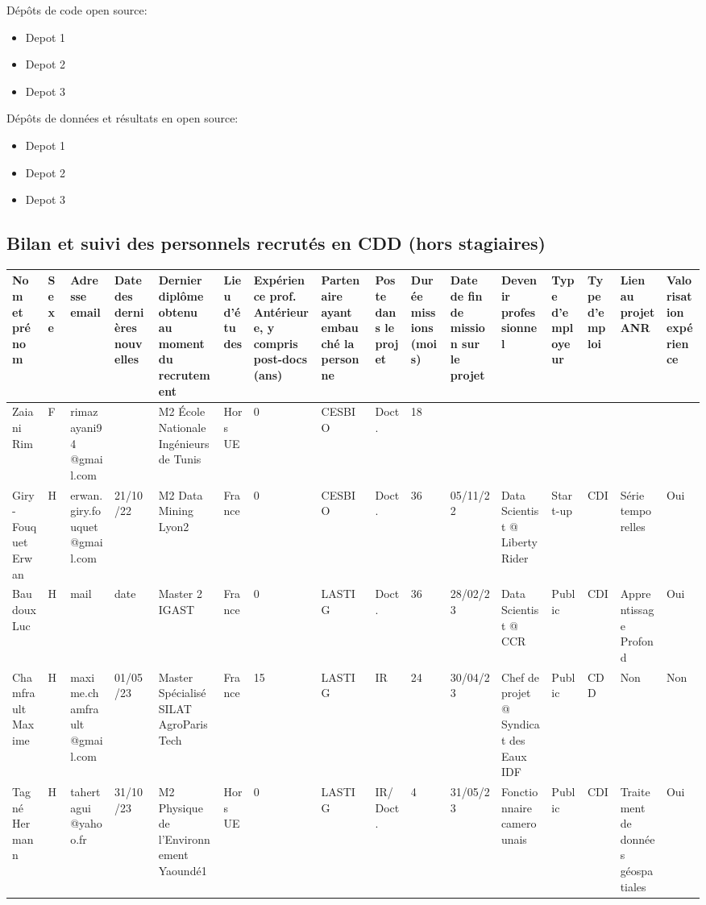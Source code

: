 Dépôts de code open source:
\begin{itemize}
    \item Depot 1
    \item Depot 2
    \item Depot 3
\end{itemize}

Dépôts de données et résultats en open source:
\begin{itemize}
    \item Depot 1
    \item Depot 2
    \item Depot 3
\end{itemize}


\newpage
\begin{landscape}
\subsection{Bilan et suivi des personnels recrutés en CDD (hors stagiaires)}

\begin{table}[htbp]
\tiny
    \centering
    \begin{tabular}{|m{1.5cm}|m{0.3cm}|m{1.5cm}|m{1.15cm}|m{1.25cm}|m{1.2cm}|m{0.95cm}|m{}|m{0.9cm}|m{0.9cm}|m{1.1cm}|m{}|m{}|m{0.85cm}|m{1.1cm}|m{}|}
    \hline
Nom et prénom & Sexe& Adresse email & Date des dernières nouvelles
 & Dernier diplôme obtenu au moment du recrutement  & 
Lieu d'études& 
Expérience prof. Antérieure, y compris post-docs (ans)  & 
Partenaire ayant embauché la personne  & 
Poste dans le projet  & 
Durée  missions (mois)  & 
Date de fin de mission sur le projet & 
Devenir professionnel & 
Type d’employeur & 
Type d’emploi  & 
Lien au projet ANR & 
Valorisation expérience \\\hline

Zaiani Rim&F&rimazayani94 @gmail.com&\jordi{??}&M2 École Nationale Ingénieurs de Tunis&Hors UE&0&CESBIO&Doct.&18&&&&&&\\\hline
Giry-Fouquet Erwan&H& erwan.giry.fouquet @gmail.com&21/10/22&M2 Data Mining Lyon2&France&0&CESBIO&Doct.&36& 05/11/22&  Data Scientist @ Liberty Rider &Start-up&CDI&Série temporelles&Oui\\\hline
Baudoux Luc&H&mail&date&Master 2 IGAST&France&0&LASTIG&Doct.&36&28/02/23&Data Scientist @ CCR&Public&CDI&Apprentissage Profond&Oui\\\hline
Chamfrault Maxime&H&maxime.chamfrault @gmail.com&01/05/23&Master Spécialisé SILAT AgroParisTech&France&15&LASTIG&IR&24&30/04/23&Chef de projet @ Syndicat des Eaux IDF&Public&CDD&Non&Non\\\hline
Tagné Hermann&H&tahertagui @yahoo.fr&31/10/23&M2 Physique de l'Environnement Yaoundé1&Hors UE&0&LASTIG&IR/Doct.&4&31/05/23&Fonctionnaire camerounais&Public&CDI&Traitement de données géospatiales&Oui\\


\end{tabular}
\end{table}
\end{landscape}
